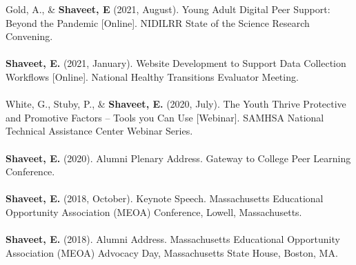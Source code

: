 \documentclass[a4paper,12pt]{article}
\begin{document}
{Gold, A., \& \textbf{Shaveet, E} (2021, August). Young Adult Digital Peer Support: Beyond the Pandemic [Online]. NIDILRR State of the Science Research Convening.\\
\\
\textbf{Shaveet, E.} (2021, January). Website Development to Support Data Collection Workflows [Online]. National Healthy Transitions Evaluator Meeting.\\
\\
White, G., Stuby, P., \& \textbf{Shaveet, E.} (2020, July). The Youth Thrive Protective and Promotive Factors – Tools you Can Use [Webinar]. SAMHSA National Technical Assistance Center Webinar Series.\\
\\
\textbf{Shaveet, E.} (2020). Alumni Plenary Address. Gateway to College Peer Learning Conference.\\
\\
\textbf{Shaveet, E.} (2018, October). Keynote Speech. Massachusetts Educational Opportunity Association (MEOA) Conference, Lowell, Massachusetts.\\
\\
\textbf{Shaveet, E.} (2018). Alumni Address. Massachusetts Educational Opportunity Association (MEOA) Advocacy Day, Massachusetts State House, Boston, MA.

}
\end{document}

